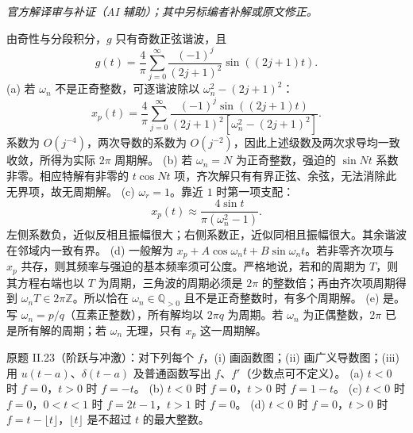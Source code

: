 \begin{solution}
\textit{官方解译审与补证（AI 辅助）；其中另标编者补解或原文修正。}\par

由奇性与分段积分，$g$ 只有奇数正弦谐波，且
\[g(t)=\frac4\pi\sum_{j=0}^{\infty}\frac{(-1)^j}{(2j+1)^2}\sin((2j+1)t).\]
(a) 若 $\omega_n$ 不是正奇整数，可逐谐波除以 $\omega_n^2-(2j+1)^2$：
\[x_p(t)=\frac4\pi\sum_{j=0}^{\infty}\frac{(-1)^j\sin((2j+1)t)}{(2j+1)^2[\omega_n^2-(2j+1)^2]}.\]
系数为 $O(j^{-4})$，两次导数的系数为 $O(j^{-2})$，因此上述级数及两次求导均一致收敛，所得为实际 $2\pi$ 周期解。
(b) 若 $\omega_n=N$ 为正奇整数，强迫的 $\sin Nt$ 系数非零。相应特解有非零的 $t\cos Nt$ 项，齐次解只有有界正弦、余弦，无法消除此无界项，故无周期解。
(c) $\omega_r=1$。靠近 $1$ 时第一项支配：
\[x_p(t)\approx\frac{4\sin t}{\pi(\omega_n^2-1)}.\]
左侧系数负，近似反相且振幅很大；右侧系数正，近似同相且振幅很大。其余谐波在邻域内一致有界。
(d) 一般解为 $x_p+A\cos\omega_nt+B\sin\omega_nt$。若非零齐次项与 $x_p$ 共存，则其频率与强迫的基本频率须可公度。严格地说，若和的周期为 $T$，则其方程右端也以 $T$ 为周期，三角波的周期必须是 $2\pi$ 的整数倍；再由齐次项周期得到 $\omega_nT\in2\pi\mathbb Z$。所以恰在 $\omega_n\in\mathbb Q_{>0}$ 且不是正奇整数时，有多个周期解。
(e) 是。写 $\omega_n=p/q$（互素正整数），所有解均以 $2\pi q$ 为周期。若 $\omega_n$ 为正偶整数，$2\pi$ 已是所有解的周期；若 $\omega_n$ 无理，只有 $x_p$ 这一周期解。
\end{solution}
\begin{exercise}\label{cw:ps6-II-23}原题 II.23（阶跃与冲激）：对下列每个 $f$，(i) 画函数图；(ii) 画广义导数图；(iii) 用 $u(t-a)$、$\delta(t-a)$ 及普通函数写出 $f$、$f'$（少数点可不定义）。
(a) $t<0$ 时 $f=0$，$t>0$ 时 $f=-t$。
(b) $t<0$ 时 $f=0$，$t>0$ 时 $f=1-t$。
(c) $t<0$ 时 $f=0$，$0<t<1$ 时 $f=2t-1$，$t>1$ 时 $f=0$。
(d) $t<0$ 时 $f=0$，$t>0$ 时 $f=t-\lfloor t\rfloor$，$\lfloor t\rfloor$ 是不超过 $t$ 的最大整数。\end{exercise}
